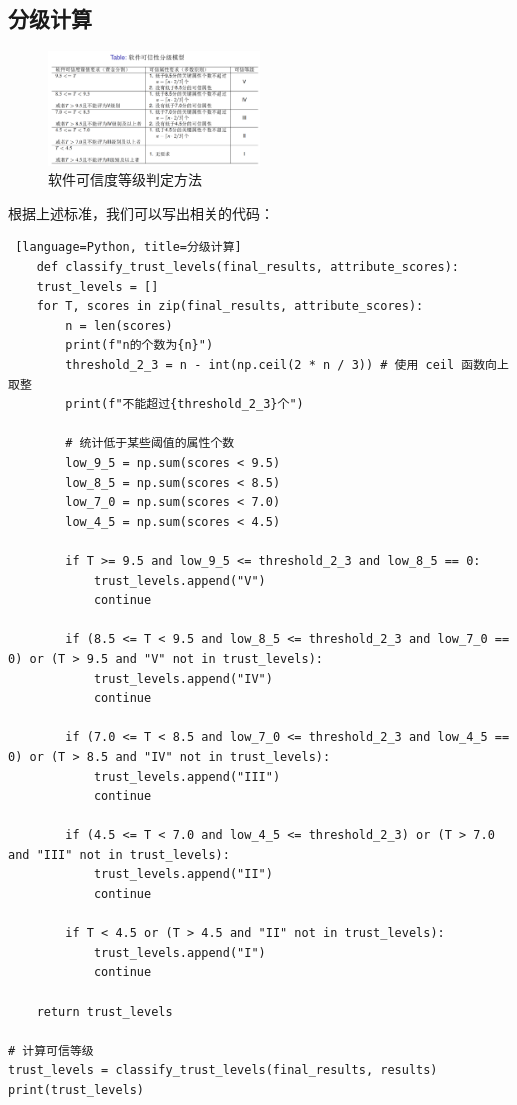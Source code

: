 \documentclass[14pt,a4paper,UTF8,twoside]{article}
\begin{document}
\subsection{分级计算}

\begin{figure}[H]
	\centering
	\includegraphics[width=0.5\textwidth]{img7/levels.png}
	\caption{软件可信度等级判定方法}
\end{figure}

根据上述标准，我们可以写出相关的代码：

\begin{lstlisting} [language=Python, title=分级计算]
	def classify_trust_levels(final_results, attribute_scores):
    trust_levels = []
    for T, scores in zip(final_results, attribute_scores):
        n = len(scores)
        print(f"n的个数为{n}")
        threshold_2_3 = n - int(np.ceil(2 * n / 3)) # 使用 ceil 函数向上取整
        print(f"不能超过{threshold_2_3}个")

        # 统计低于某些阈值的属性个数
        low_9_5 = np.sum(scores < 9.5)
        low_8_5 = np.sum(scores < 8.5)
        low_7_0 = np.sum(scores < 7.0)
        low_4_5 = np.sum(scores < 4.5)

        if T >= 9.5 and low_9_5 <= threshold_2_3 and low_8_5 == 0:
            trust_levels.append("V")
            continue

        if (8.5 <= T < 9.5 and low_8_5 <= threshold_2_3 and low_7_0 == 0) or (T > 9.5 and "V" not in trust_levels):
            trust_levels.append("IV")
            continue

        if (7.0 <= T < 8.5 and low_7_0 <= threshold_2_3 and low_4_5 == 0) or (T > 8.5 and "IV" not in trust_levels):
            trust_levels.append("III")
            continue

        if (4.5 <= T < 7.0 and low_4_5 <= threshold_2_3) or (T > 7.0 and "III" not in trust_levels):
            trust_levels.append("II")
            continue

        if T < 4.5 or (T > 4.5 and "II" not in trust_levels):
            trust_levels.append("I")
            continue

    return trust_levels

# 计算可信等级
trust_levels = classify_trust_levels(final_results, results)
print(trust_levels)
\end{lstlisting}
\end{document}
